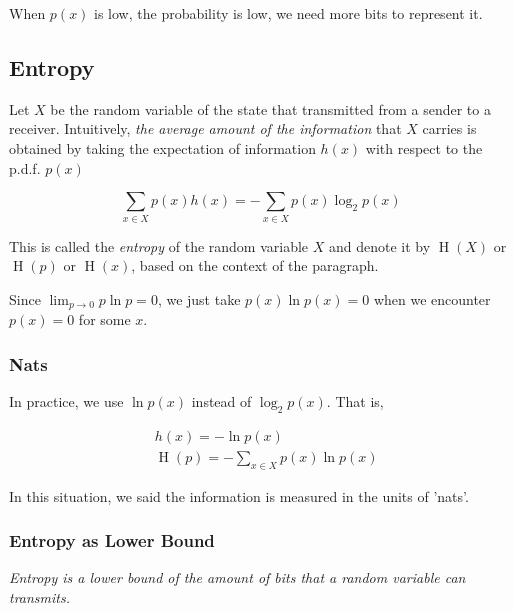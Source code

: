 \documentclass{article}
\begin{document}
            When $ p(x) $ is low, the probability is low, we need more bits to
            represent it.

        \subsection{Entropy}

            Let $ X $ be the random variable of the state that transmitted from
            a sender to a receiver. Intuitively, \textit{the average amount of
            the information} that $ X $ carries is obtained by taking the
            expectation of information $ h(x) $ with respect to the p.d.f.
            $ p(x) $

            \begin{equation*}
                 \sum_{x \in X} p(x) h(x) = - \sum_{x \in X} p(x) \log_2 p(x)
            \end{equation*}

            This is called the \textit{entropy} of the random variable $ X $
            and denote it by $ \operatorname{H}(X) $ or $ \operatorname{H}(p) $
            or $ \operatorname{H}(x) $, based on the context of the paragraph.

            Since $ \lim_{p \rightarrow 0} p \ln p = 0 $,
            we just take $ p(x) \ln p(x) = 0 $ when we encounter $ p(x) = 0 $ for some
            $ x $.
            
            \subsubsection{Nats}

                In practice, we use $ \ln p(x)$ instead of $\log_2 p(x) $. That is,

                \begin{align*}
                    &h(x)=-\ln p(x)\\
                    &\operatorname{H}(p) = -\sum_{x \in X} p(x) \ln p(x)
                \end{align*}

                In this situation, we said the information is measured in the
                units of 'nats'.

            \subsubsection{Entropy as Lower Bound}

                \begin{displayquote}
                    \textit{Entropy is a lower bound of the amount of bits that
                    a random variable can transmits.}
                \end{displayquote}
\end{document}
